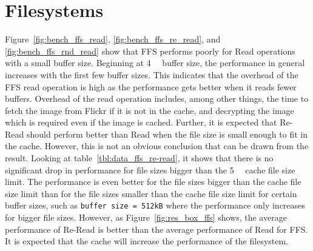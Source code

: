 \section{Filesystems}
\label{sec:dis_fs}
Figure~\ref{fig:bench_ffs_read}, \ref{fig:bench_ffs_re_read}, and \ref{fig:bench_ffs_rnd_read} show that \gls{FFS} performs poorly for Read operations with a small buffer size. Beginning at \SI{4}{\kilo\byte} buffer size, the performance in general increases with the first few buffer sizes. This indicates that the overhead of the \gls{FFS} read operation is high as the performance gets better when it reads fewer buffers. Overhead of the read operation includes, among other things, the time to fetch the image from Flickr if it is not in the cache, and decrypting the image which is required even if the image is cached. Further, it is expected that \mbox{Re-Read} should perform better than Read when the file size is small enough to fit in the cache. However, this is not an obvious conclusion that can be drawn from the result. Looking at table~\ref{tbl:data_ffs_re-read}, it shows that there is no significant drop in performance for file sizes bigger than the \SI{5}{\mega\byte} cache file size limit. The performance is even better for the file sizes bigger than the cache file size limit than for the file sizes smaller than the cache file size limit for certain buffer sizes, such as \texttt{buffer size = 512kB} where the performance only increases for bigger file sizes. However, as Figure~\ref{fig:res_box_ffs} shows, the average performance of \mbox{Re-Read} is better than the average performance of Read for \gls{FFS}. It is expected that the cache will increase the performance of the filesystem.


